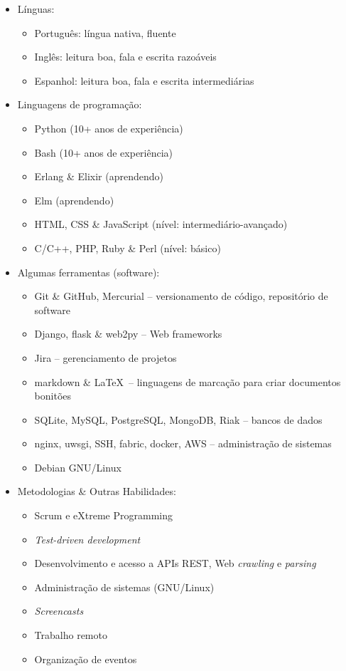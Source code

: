 \documentclass[a4paper,11pt]{article}
\begin{document}
	\begin{itemize}
		\item Línguas:
		\begin{itemize}
			\item Português: língua nativa, fluente
			\item Inglês: leitura boa, fala e escrita razoáveis
			\item Espanhol: leitura boa, fala e escrita intermediárias
		\end{itemize}
		\item Linguagens de programação:
		\begin{itemize}
			\item Python (10+ anos de experiência)
			\item Bash (10+ anos de experiência)
			\item Erlang \& Elixir (aprendendo)
			\item Elm (aprendendo)
			\item HTML, CSS \& JavaScript (nível: intermediário-avançado)
			\item C/C++, PHP, Ruby \& Perl (nível: básico)
		\end{itemize}
		\item Algumas ferramentas (software):
		\begin{itemize}
			\item Git \& GitHub, Mercurial -- versionamento de código,
				repositório de software
			\item Django, flask \& web2py -- Web frameworks
			\item Jira -- gerenciamento de projetos
			\item markdown \& \LaTeX\ -- linguagens de marcação para criar
				documentos bonitões
			\item SQLite, MySQL, PostgreSQL, MongoDB, Riak -- bancos de dados
			\item nginx, uwsgi, SSH, fabric, docker, AWS -- administração de
				sistemas
			\item Debian GNU/Linux
		\end{itemize}
		\item Metodologias \& Outras Habilidades:
		\begin{itemize}
			\item Scrum e eXtreme Programming
			\item \textit{Test-driven development}
			\item Desenvolvimento e acesso a APIs REST, Web \textit{crawling} e
				\textit{parsing}
			\item Administração de sistemas (GNU/Linux)
			\item \textit{Screencasts}
			\item Trabalho remoto
			\item Organização de eventos
		\end{itemize}
	\end{itemize}
\end{document}
